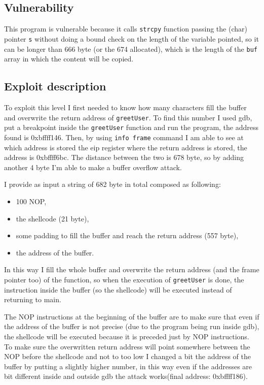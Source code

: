 \documentclass[a4paper,12pt]{article}
\begin{document}
\subsection{Vulnerability}

This program is vulnerable because it calls \texttt{strcpy} function passing the (char) pointer \texttt{s} without doing a bound check on the length of the variable pointed, so it can be longer than 666 byte (or the 674 allocated), which is the length of the \texttt{buf} array in which the content will be copied.

\subsection{Exploit description}

To exploit this level I first needed to know how many characters fill the buffer and overwrite the return address of \texttt{greetUser}. To find this number I used gdb, put a breakpoint inside the \texttt{greetUser} function and run the program, the address found is 0xbffff146. Then, by using \texttt{info frame} command I am able to see at which address is stored the eip register where the return address is stored, the address is 0xbffff6bc. The distance between the two is 678 byte, so by adding another 4 byte I'm able to make a buffer overflow attack.

I provide as input a string of 682 byte in total composed as following:
\begin{itemize}
\item 100 NOP,
\item the shellcode (21 byte),
\item some padding to fill the buffer and reach the return address (557 byte),
\item the address of the buffer.
\end{itemize}


In this way I fill the whole buffer and overwrite the return address (and the frame pointer too) of the function, so when the execution of \texttt{greetUser} is done, the instruction inside the buffer (so the shellcode) will be executed instead of returning to main. 

The NOP instructions at the beginning of the buffer are to make sure that even if the address of the buffer is not precise (due to the program being run inside gdb), the shellcode will be executed because it is preceded just by NOP instructions. To make sure the overwritten return address will point somewhere between the NOP before the shellcode and not to too low I changed a bit the address of the buffer by putting a slightly higher number, in this way even if the addresses are bit different inside and outside gdb the attack works(final address: 0xbffff186).
\end{document}
